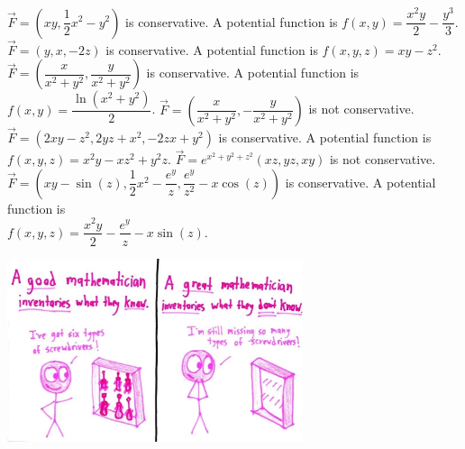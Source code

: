 \begin{Answer}
    
     \Question $\vec F = \left(xy, \dfrac{1}{2}x^2-y^2 \right)$ is conservative. A potential function is $f(x,y) = \dfrac{x^2y}{2} - \dfrac{y^3}{3}$.
     \Question $\vec F = \left(y, x, -2z \right)$ is conservative. A potential function is $f(x,y,z) = xy - z^2$.
     \Question $\vec F = \left( \dfrac{x}{x^2+y^2}, \dfrac{y}{x^2+y^2} \right)$ is conservative. A potential function is $f(x,y) = \dfrac{\ln \left(x^2 + y^2 \right)}{2} $.
     \Question $\vec F = \left( \dfrac{x}{x^2+y^2}, -\dfrac{y}{x^2+y^2} \right)$ is not conservative. 
     \Question $\vec F = \left( 2xy-z^2, 2yz+x^2, -2zx+y^2\right)$ is conservative. A potential function is \\ $f(x,y,z) = x^2y-xz^2+y^2z$.
     \Question $\vec F = e^{x^2+y^2+z^2}\left( xz, yz, xy\right)$ is not conservative. 
     \Question $\vec F = \left( xy - \sin (z), \dfrac{1}{2}x^2 - \dfrac{e^y}{z}, \dfrac{e^y}{z^2} - x \cos (z)\right)$ is conservative. A potential function is \\ $f(x,y,z) = \dfrac{x^2y}{2} -  \dfrac{e^y}{z} - x \sin(z)$.
    
\end{Answer}






	\begin{center}
			\includegraphics[width=0.65\textwidth]{GreatMath_7.jpg}
	\end{center}

